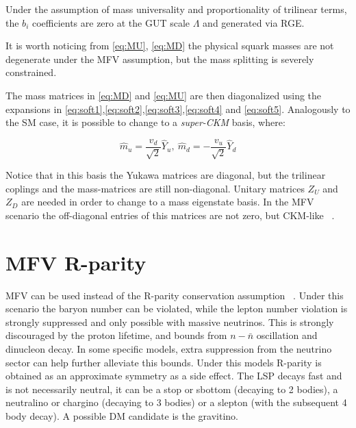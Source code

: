 Under the assumption of mass universality and proportionality of trilinear terms, the $b_i$ coefficients are zero at the GUT scale $\Lambda$ and generated via RGE. %

It is worth noticing from \ref{eq:MU}, \ref{eq:MD} the physical squark masses are not degenerate under the MFV assumption, but the mass splitting is severely constrained. 

The mass matrices in \ref{eq:MD} and \ref{eq:MU} are then diagonalized using the expansions in \ref{eq:soft1},\ref{eq:soft2},\ref{eq:soft3},\ref{eq:soft4} and \ref{eq:soft5}. Analogously to the SM case, it is possible to change to a \textit{super-CKM} basis, where:

\begin{equation}
\hat{m}_u = \frac{v_d}{\sqrt{2}}\hat{Y}_{u},\ \hat{m}_d = -\frac{v_u}{\sqrt{2}}\hat{Y}_{d}
\end{equation}

Notice that in this basis the Yukawa matrices are diagonal, but the trilinear coplings and the mass-matrices are still non-diagonal. Unitary matrices $Z_U$ and $Z_D$ are needed in order to change to a mass eigenstate basis. In the MFV scenario the off-diagonal entries of this matrices are not zero, but CKM-like ~\cite{Altmannshofer:2007cs}.

\section{MFV R-parity}
\label{sec:MFVRPV}
MFV can be used instead of the R-parity conservation assumption ~\cite{Csaki:2011ge}. Under this scenario the baryon number can be violated, while the lepton number violation is strongly suppressed and only possible with massive neutrinos. This is strongly discouraged by the proton lifetime, and bounds from $n - \bar{n}$ oscillation and dinucleon decay. In some specific models, extra suppression from the neutrino sector can help further alleviate this bounds. 
Under this models R-parity is obtained as an approximate symmetry as a side effect. The LSP decays fast and is not necessarily neutral, it can be a stop or sbottom (decaying to 2 bodies), a neutralino or chargino (decaying to 3 bodies) or a slepton (with the subsequent 4 body decay). A possible DM candidate is the gravitino. 


